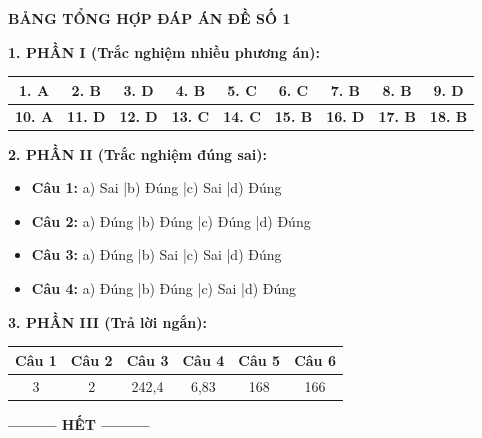 \documentclass[12pt,a4paper]{article}
\begin{document}
\vspace{0.4cm}
\noindent\hrulefill
\smallskip

\noindent
{\color{hfRed}\textbf{\large BẢNG TỔNG HỢP ĐÁP ÁN ĐỀ SỐ 1}}

\smallskip
\noindent
\textbf{1. PHẦN I (Trắc nghiệm nhiều phương án):}
\begin{center}
\begin{tabular}{|c|c|c|c|c|c|c|c|c|}
\hline
\textbf{1. A} & \textbf{2. B} & \textbf{3. D} & \textbf{4. B} & \textbf{5. C} & \textbf{6. C} & \textbf{7. B} & \textbf{8. B} & \textbf{9. D} \\ \hline
\textbf{10. A} & \textbf{11. D} & \textbf{12. D} & \textbf{13. C} & \textbf{14. C} & \textbf{15. B} & \textbf{16. D} & \textbf{17. B} & \textbf{18. B} \\ \hline
\end{tabular}
\end{center}

\noindent
\textbf{2. PHẦN II (Trắc nghiệm đúng sai):}
\begin{itemize}
	\item \textbf{Câu 1:} a) Sai \quad|\quad b) Đúng \quad|\quad c) Sai \quad|\quad d) Đúng
	\item \textbf{Câu 2:} a) Đúng \quad|\quad b) Đúng \quad|\quad c) Đúng \quad|\quad d) Đúng
	\item \textbf{Câu 3:} a) Đúng \quad|\quad b) Sai \quad|\quad c) Sai \quad|\quad d) Đúng
	\item \textbf{Câu 4:} a) Đúng \quad|\quad b) Đúng \quad|\quad c) Sai \quad|\quad d) Đúng
\end{itemize}

\noindent
\textbf{3. PHẦN III (Trả lời ngắn):}
\begin{center}
\begin{tabular}{|c|c|c|c|c|c|}
\hline
\textbf{Câu 1} & \textbf{Câu 2} & \textbf{Câu 3} & \textbf{Câu 4} & \textbf{Câu 5} & \textbf{Câu 6} \\ \hline
3 & 2 & 242{,}4 & 6{,}83 & 168 & 166 \\ \hline
\end{tabular}
\end{center}

\begin{center}
\textbf{--------- HẾT ---------}
\end{center}
\end{document}

